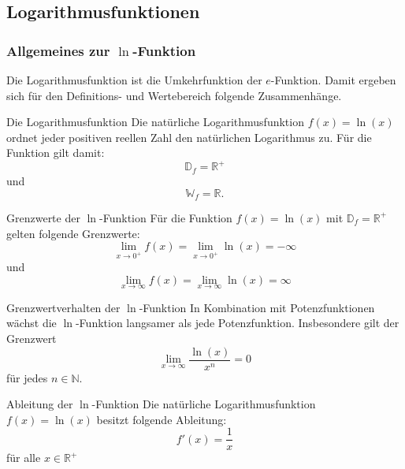  \subsection{Logarithmusfunktionen}
 \subsubsection{Allgemeines zur \texorpdfstring{$\ln$}{ln}-Funktion}
 Die Logarithmusfunktion ist die Umkehrfunktion der $e$-Funktion. Damit ergeben sich für den Definitions- und Wertebereich folgende Zusammenhänge.
 \begin{satz}{Die Logarithmusfunktion}{}
Die natürliche Logarithmusfunktion $f(x) = \ln{(x)}$ ordnet jeder positiven reellen Zahl den natürlichen Logarithmus zu. Für die Funktion gilt damit: $$\mathds{D}_f = \mathds{R}^+$$ und $$\mathds{W}_f = \mathds{R}.$$
 \end{satz}
 \begin{center}
\end{center}
\begin{bem}{Grenzwerte der $\ln$-Funktion}{}
Für die Funktion $f(x) = \ln{(x)}$ mit $\mathds{D}_f = \mathds{R}^+$ gelten folgende Grenzwerte:
$$\lim_{x \longrightarrow 0^+} f(x) = \lim_{x \longrightarrow 0^+} \ln{(x)} = -\infty$$ und $$\lim_{x \longrightarrow \infty} f(x) = \lim_{x \longrightarrow \infty} \ln{(x)} = \infty$$
\end{bem}
\begin{satz}{Grenzwertverhalten der $\ln{}$-Funktion}{}
In Kombination mit Potenzfunktionen wächst die $\ln{}$-Funktion langsamer als jede Potenzfunktion. Insbesondere gilt der Grenzwert $$\lim_{x\longrightarrow \infty} \dfrac{\ln{(x)}}{x^n} = 0$$ für jedes $n\in \mathds{N}$.
\end{satz}
\begin{satz}{Ableitung der $\ln$-Funktion}{} 
Die natürliche Logarithmusfunktion $f(x) = \ln{(x)}$ besitzt folgende Ableitung: $$f'(x) = \dfrac{1}{x}$$ für alle $x\in \mathds{R}^+$
\end{satz}
